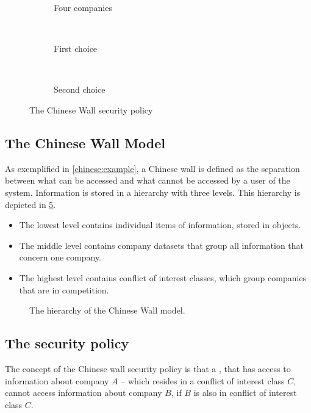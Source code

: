 \begin{figure}
\centering
    \begin{subfigure}[t]{0.3\textwidth}
        \resizebox{\linewidth}{!}{}
        \caption{Four companies}
        \label{chinese:illu:situation}
    \end{subfigure}
    ~
    \begin{subfigure}[t]{0.3\textwidth}
        \resizebox{\linewidth}{!}{}
        \caption{First choice}
        \label{chinese:illu:choice1}
    \end{subfigure}
    ~
    \begin{subfigure}[t]{0.3\textwidth}
        \resizebox{\linewidth}{!}{}
        \caption{Second choice}
        \label{chinese:illu:choice2}
    \end{subfigure}
    \caption{The Chinese Wall security policy}\label{chinese:illu}
\end{figure}


\subsection*{The Chinese Wall Model}
As exemplified in \cref{chinese:example}, a Chinese wall is defined as the separation between what can be accessed and what cannot be accessed by a user of the system.
Information is stored in a hierarchy with three levels. 
This hierarchy is depicted in \cref{china:hierarchy}.

\begin{itemize}
	\item The lowest level contains individual items of information, stored in objects.
	\item The middle level contains company datasets that group all information that concern one company. 
	\item The highest level contains conflict of interest classes, which group companies that are in competition.
\end{itemize}

\begin{figure}[h]
  \resizebox{\textwidth}{!}{
	}
	\caption{The hierarchy of the Chinese Wall model.}
	\label{china:hierarchy}
\end{figure}

\subsection{The security policy}
The concept of the Chinese wall security policy is that a \principal{}, that has access to information about company $A$ -- which resides in a conflict of interest class $C$, cannot access information about company $B$, if $B$ is also in conflict of interest class $C$.

